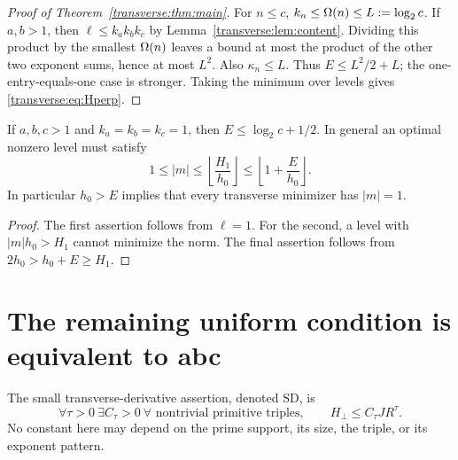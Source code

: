 \begin{proof}[Proof of Theorem~\ref{transverse:thm:main}]
For $n\le c$, $k_n\le\Omega(n)\le L:=\log_2c$. If $a,b>1$, then $\ell\le k_a k_b k_c$ by Lemma~\ref{transverse:lem:content}. Dividing this product by the smallest $\Omega(n)$ leaves a bound at most the product of the other two exponent sums, hence at most $L^2$. Also $\kappa_n\le L$. Thus $E\le L^2/2+L$; the one-entry-equals-one case is stronger. Taking the minimum over levels gives \eqref{transverse:eq:Hperp}.
\end{proof}

\begin{corollary}\label{transverse:cor:truncate}
If $a,b,c>1$ and $k_a=k_b=k_c=1$, then $E\le\log_2c+1/2$. In general an optimal nonzero level must satisfy
\[
 1\le |m|\le\left\lfloor\frac{H_1}{h_0}\right\rfloor
 \le\left\lfloor1+\frac E{h_0}\right\rfloor.
\]
In particular $h_0>E$ implies that every transverse minimizer has $|m|=1$.
\end{corollary}
\begin{proof}
The first assertion follows from $\ell=1$. For the second, a level with $|m|h_0>H_1$ cannot minimize the norm. The final assertion follows from $2h_0>h_0+E\ge H_1$.
\end{proof}

\section{The remaining uniform condition is equivalent to abc}\label{transverse:sec:equivalence}
\begin{definition}
The small transverse-derivative assertion, denoted $\mathrm{SD}$, is
\[
 \forall\tau>0\ \exists C_\tau>0\ \forall\text{ nontrivial primitive triples},
 \qquad H_\perp\le C_\tau J R^\tau.
\]
No constant here may depend on the prime support, its size, the triple, or its exponent pattern.
\end{definition}

